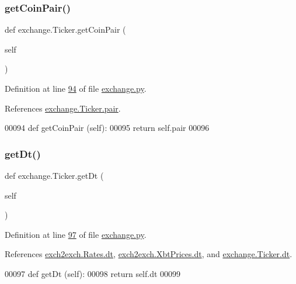 \subsubsection{\texorpdfstring{get\+Coin\+Pair()}{getCoinPair()}}
{\footnotesize\ttfamily def exchange.\+Ticker.\+get\+Coin\+Pair (\begin{DoxyParamCaption}\item[{}]{self }\end{DoxyParamCaption})}



Definition at line \hyperlink{exchange_8py_source_l00094}{94} of file \hyperlink{exchange_8py_source}{exchange.\+py}.



References \hyperlink{exchange_8py_source_l00058}{exchange.\+Ticker.\+pair}.


\begin{DoxyCode}
00094     \textcolor{keyword}{def }getCoinPair (self):
00095         \textcolor{keywordflow}{return} self.pair
00096         
\end{DoxyCode}
\mbox{\label{classexchange_1_1_ticker_aaa2f7d66782b9405c286e98bfb281d45}} 
\subsubsection{\texorpdfstring{get\+Dt()}{getDt()}}
{\footnotesize\ttfamily def exchange.\+Ticker.\+get\+Dt (\begin{DoxyParamCaption}\item[{}]{self }\end{DoxyParamCaption})}



Definition at line \hyperlink{exchange_8py_source_l00097}{97} of file \hyperlink{exchange_8py_source}{exchange.\+py}.



References \hyperlink{exch2exch_8py_source_l00028}{exch2exch.\+Rates.\+dt}, \hyperlink{exch2exch_8py_source_l00057}{exch2exch.\+Xbt\+Prices.\+dt}, and \hyperlink{exchange_8py_source_l00059}{exchange.\+Ticker.\+dt}.


\begin{DoxyCode}
00097     \textcolor{keyword}{def }getDt (self):
00098         \textcolor{keywordflow}{return} self.dt
00099     
\end{DoxyCode}
\mbox{\label{classexchange_1_1_ticker_a2e5bb124c8f6dcad031ef9a023079081}} 
